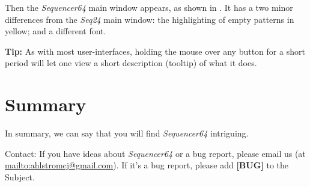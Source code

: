 \documentclass[
 11pt,
 twoside,
 a4paper,
 headinclude,
 footinclude,
 final                                 %
]{article}
\begin{document}
   Then the \textsl{Sequencer64} main window appears, as shown in
   .  It has a two minor differences
   from the \textsl{Seq24} main window: the highlighting of
   empty patterns in yellow; and a different font.

   \textbf{Tip:}
   As with most user-interfaces, holding the mouse over any button for a
   short period will let one view a short description (tooltip)
   of what it does.









































\section{Summary}
\label{sec:summary}

   In summary, we can say that you will find \textsl{Sequencer64} intriguing.

   Contact: If you have ideas about \textsl{Sequencer64} or a bug report, please
   email us (at \url{mailto:ahlstromcj@gmail.com}).
   If it's a bug report, please add \textbf{[BUG]} to the Subject.




\printindex
\end{document}
